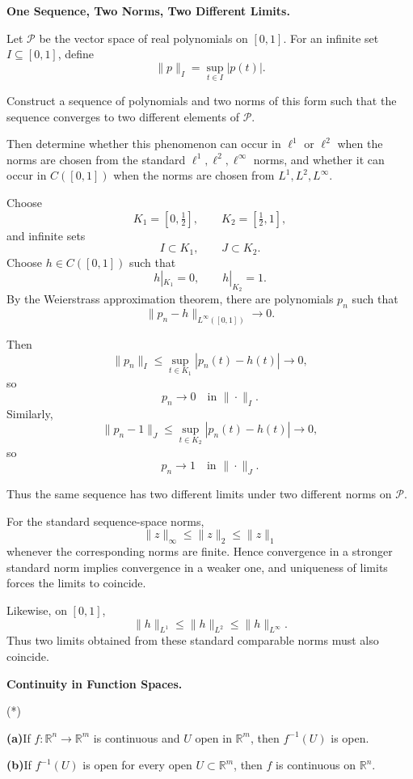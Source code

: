 \begin{problem}[CP-II-0053]
\label{prob:cp-ii-0053}
\textbf{One Sequence, Two Norms, Two Different Limits.}

\hspace*{1.5em}Let \(\mathcal P\) be the vector space of real polynomials on
\([0,1]\). For an infinite set \(I\subseteq[0,1]\), define
\[
\|p\|_I=\sup_{t\in I}|p(t)|.
\]

Construct a sequence of polynomials and two norms of this form such
that the sequence converges to two different elements of
\(\mathcal P\).

Then determine whether this phenomenon can occur in \(\ell^1\) or
\(\ell^2\) when the norms are chosen from the standard
\(\ell^1,\ell^2,\ell^\infty\) norms, and whether it can occur in
\(C([0,1])\) when the norms are chosen from
\(L^1,L^2,L^\infty\).
\end{problem}

\begin{solution}
Choose
\[
K_1=[0,\tfrac12],
\qquad
K_2=[\tfrac12,1],
\]
and infinite sets
\[
I\subset K_1,
\qquad
J\subset K_2.
\]
Choose \(h\in C([0,1])\) such that
\[
h|_{K_1}=0,
\qquad
h|_{K_2}=1.
\]
By the Weierstrass approximation theorem, there are polynomials
\(p_n\) such that
\[
\|p_n-h\|_{L^\infty([0,1])}\longrightarrow0.
\]

Then
\[
\|p_n\|_I
\le
\sup_{t\in K_1}|p_n(t)-h(t)|
\longrightarrow0,
\]
so
\[
p_n\longrightarrow0
\quad\text{in }\|\cdot\|_I.
\]
Similarly,
\[
\|p_n-1\|_J
\le
\sup_{t\in K_2}|p_n(t)-h(t)|
\longrightarrow0,
\]
so
\[
p_n\longrightarrow1
\quad\text{in }\|\cdot\|_J.
\]

Thus the same sequence has two different limits under two different
norms on \(\mathcal P\).

For the standard sequence-space norms,
\[
\|z\|_\infty\le\|z\|_2\le\|z\|_1
\]
whenever the corresponding norms are finite. Hence convergence in a
stronger standard norm implies convergence in a weaker one, and
uniqueness of limits forces the limits to coincide.

Likewise, on \([0,1]\),
\[
\|h\|_{L^1}
\le
\|h\|_{L^2}
\le
\|h\|_{L^\infty}.
\]
Thus two limits obtained from these standard comparable norms must
also coincide.
\end{solution}


\begin{problem}[CP-II-0054]
\label{prob:cp-ii-0054}
\textbf{Continuity in Function Spaces.}

\hspace*{1.5em}(*)

\renewcommand\labelenumi{(\alph{enumi})}
\par\smallskip\noindent\textbf{(a)}\quad If $f:\mathbb{R}^n\to\mathbb{R}^m$ is continuous and $U$ open in $\mathbb{R}^m$, then $f^{-1}(U)$ is open.
\par\smallskip\noindent\textbf{(b)}\quad If $f^{-1}(U)$ is open for every open $U\subset\mathbb{R}^m$, then $f$ is continuous on $\mathbb{R}^n$.
\end{problem}

